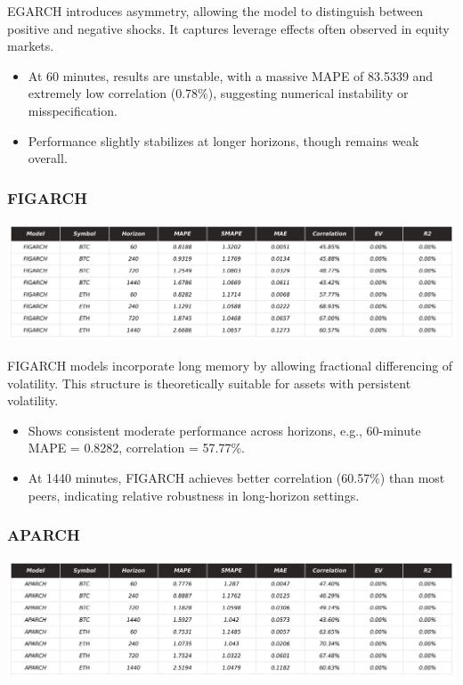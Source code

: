 \documentclass[9pt]{article}
\begin{document}
\begin{multicols}{2}
		EGARCH introduces asymmetry, allowing the model to distinguish between positive and negative shocks. It captures leverage effects often observed in equity markets.
		
		\begin{itemize}
			\item At 60 minutes, results are unstable, with a massive MAPE of 83.5339 and extremely low correlation (0.78\%), suggesting numerical instability or misspecification.
			\item Performance slightly stabilizes at longer horizons, though remains weak overall.
		\end{itemize}
		
		\subsubsection{FIGARCH}
		\centering
		\includegraphics[width=.95\columnwidth]{img/_KPI_FIGARCH.png}
		\label{fig:_KPI_FIGARCH}
		\justifying
		\medskip
		
		FIGARCH models incorporate long memory by allowing fractional differencing of volatility. This structure is theoretically suitable for assets with persistent volatility.
		
		\begin{itemize}
			\item Shows consistent moderate performance across horizons, e.g., 60-minute MAPE = 0.8282, correlation = 57.77\%.
			\item At 1440 minutes, FIGARCH achieves better correlation (60.57\%) than most peers, indicating relative robustness in long-horizon settings.
		\end{itemize}
		
		\subsubsection{APARCH}
		\centering
		\includegraphics[width=.95\columnwidth]{img/_KPI_APARCH.png}
		\label{fig:_KPI_APARCH}
		\justifying
		\medskip
		

\end{multicols}
\end{document}
